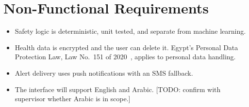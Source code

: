 \section{Non-Functional Requirements}
\begin{itemize}
  \item Safety logic is deterministic, unit tested, and separate from machine learning.
  \item Health data is encrypted and the user can delete it. Egypt's Personal Data Protection Law, Law No.~151 of 2020~\cite{egyptpdpl}, applies to personal data handling.
  \item Alert delivery uses push notifications with an SMS fallback.
  \item The interface will support English and Arabic. [TODO: confirm with supervisor whether Arabic is in scope.]
\end{itemize}
